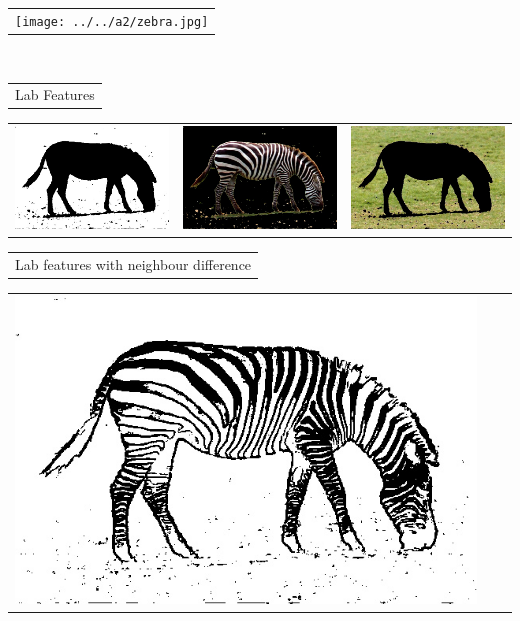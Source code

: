\documentclass{article}
\begin{document}
\begin{center}
\begin{tabular}{c}
\texttt{[image: ../../a2/zebra.jpg]}
\end{tabular}
\\
\begin{tabular}{c}

Lab Features \\
\end{tabular}
 \begin{tabular}{c c c} 

 \includegraphics[width=.37\linewidth]{../image-segmentation/output/Lab/zebra_mask.jpg} & 
 
 \includegraphics[width=.37\linewidth]{../image-segmentation/output/Lab/zebra_seg1.jpg} & \includegraphics[width=.37\linewidth]{../image-segmentation/output/Lab/zebra_seg2.jpg} \\
  
 \end{tabular}
 \begin{tabular}{c}

Lab features with neighbour difference \\
\end{tabular}
 \begin{tabular}{c c c} 

 \includegraphics[width=.37\linewidth]{../image-segmentation/output/add-Lab-neighbor-diff-feature/zebra_mask.jpg} & 
 

\end{tabular}
\end{center}
\end{document}
